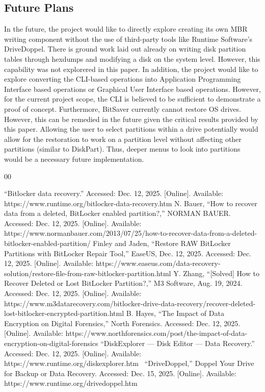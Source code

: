 \documentclass[conference]{IEEEtran} \IEEEoverridecommandlockouts
\begin{document}
\subsection{Future Plans}

In the future, the project would like to directly explore creating its own
MBR writing component without the use of third-party tools like Runtime
Software's DriveDoppel. There is ground work laid out already on writing
disk partition tables through hexdumps and modifying a disk on the system
level. However, this capability was not explorered in this paper. In addition,
the project would like to explore converting the CLI-based operations into
Application Programming Interface based operations or Graphical User Interface based operations.
However, for the current project
scope, the CLI is believed to be sufficient to demonstrate a proof of concept. Furthermore, BitSaver currently cannot restore
OS drives. However, this can be remedied in the future given the critical results provided by this paper.
Allowing the user to select partitions within a drive potentially would allow for the restoration
to work on a partition level without affecting other partitions (similar to DiskPart). 
Thus, deeper menus to look into partitions would be a necessary future implementation.

\begin{thebibliography}{00} \raggedright 
	 “Bitlocker data
	recovery.” Accessed: Dec. 12, 2025. [Online]. Available:
	https://www.runtime.org/bitlocker-data-recovery.htm 
	 N.
	Bauer, “How to recover data from a deleted, BitLocker enabled
	partition?,” NORMAN BAUER. Accessed: Dec. 12, 2025. [Online].
	Available:
	https://www.normanbauer.com/2013/07/25/how-to-recover-data-from-a-deleted-bitlocker-enabled-partition/
	 Finley and Jaden, “Restore RAW BitLocker Partitions with
	BitLocker Repair Tool,” EaseUS, Dec. 12, 2025. Accessed: Dec. 12, 2025.
	[Online]. Available:
	https://www.easeus.com/data-recovery-solution/restore-file-from-raw-bitlocker-partition.html
	 Y. Zhang, “[Solved] How to Recover Deleted or Lost
	BitLocker Partition?,” M3 Software, Aug. 19, 2024. Accessed: Dec. 12,
	2025. [Online]. Available:
	https://www.m3datarecovery.com/bitlocker-drive-data-recovery/recover-deleted-lost-bitlocker-encrypted-partition.html
	 B. Hayes, “The Impact of Data Encryption on Digital
	Forensics,” North Forensics. Accessed: Dec. 12, 2025. [Online].
	Available:
	https://www.northforensics.com/post/the-impact-of-data-encryption-on-digital-forensics
	 “DiskExplorer — Disk Editor — Data Recovery.” Accessed:
	Dec. 12, 2025. [Online]. Available:
	https://www.runtime.org/diskexplorer.htm\ 
	 “DriveDoppel,” Doppel Your Drive for Backup or Data Recovery. Accessed: Dec. 15, 2025. [Online]. Available: https://www.runtime.org/drivedoppel.htm
  




\end{thebibliography}

	\vspace{12pt}

	
\end{document}
